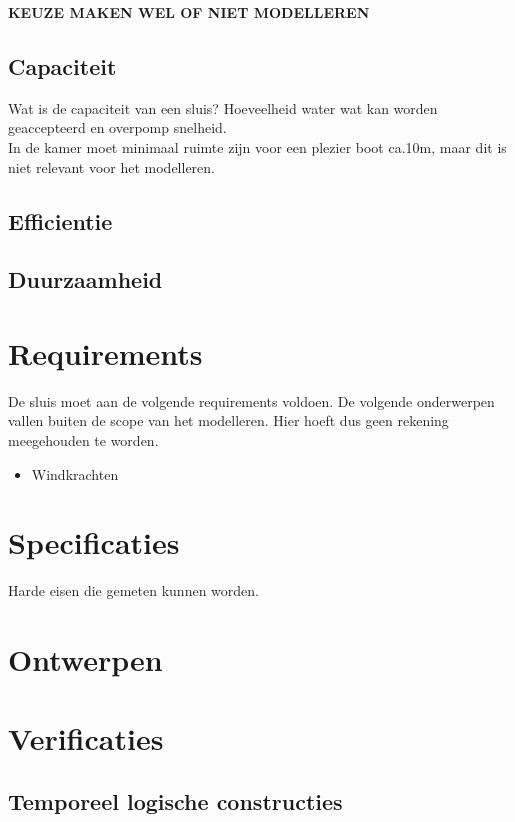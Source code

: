 \documentclass{article}
\begin{document}
\vskip0.5cm

{\large \textbf{KEUZE MAKEN WEL OF NIET MODELLEREN}}

\subsection{Capaciteit}
Wat is de capaciteit van een sluis? Hoeveelheid water wat kan worden geaccepteerd en overpomp snelheid.\\
In de kamer moet minimaal ruimte zijn voor een plezier boot ca.10m, maar dit is niet relevant voor het modelleren.

\vskip0.5cm

\subsection{Efficientie}

\subsection{Duurzaamheid}

\section{Requirements} %
De sluis moet aan de volgende requirements voldoen.
\vskip0.5cm
De volgende onderwerpen vallen buiten de scope van het modelleren. Hier hoeft dus geen rekening meegehouden te worden.
\begin{itemize}
\item Windkrachten
\end{itemize}

\section{Specificaties} %
Harde eisen die gemeten kunnen worden.

\section{Ontwerpen} %

\section{Verificaties}
\subsection{Temporeel logische constructies}
\end{document}
